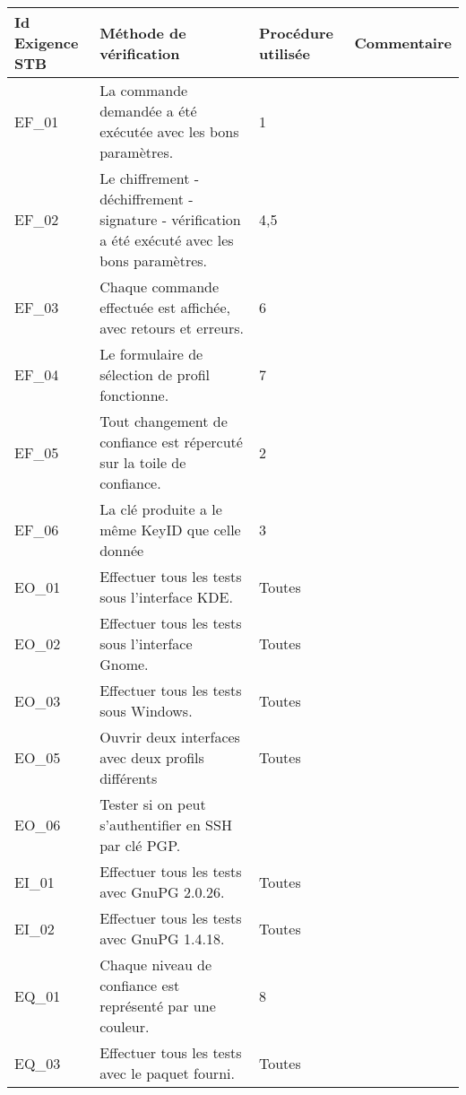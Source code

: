 \documentclass{../res/univ-projet}
\begin{document}
\begin{center}
    \begin{tabular}{|p{2.8cm}|p{4.2cm}|p{3cm}|p{5cm}|}
      \hline
      Id Exigence STB & Méthode de vérification & Procédure utilisée & Commentaire\\ \hline
      EF\_01 & La commande demandée a été exécutée avec les bons paramètres. & 1 & \\ \hline
      EF\_02 & Le chiffrement - déchiffrement - signature - vérification a été exécuté avec les bons paramètres. & 4,5 & \\ \hline
      EF\_03 & Chaque commande effectuée est affichée, avec retours et erreurs. & 6 & \\ \hline
      EF\_04 & Le formulaire de sélection de profil fonctionne. & 7 & \\ \hline
      EF\_05 & Tout changement de confiance est répercuté sur la toile de confiance. & 2 & \\ \hline
      EF\_06 & La clé produite a le même KeyID que celle donnée & 3 & \\ \hline
      EO\_01 & Effectuer tous les tests sous l'interface KDE. & Toutes & \\ \hline
      EO\_02 & Effectuer tous les tests sous l'interface Gnome. & Toutes & \\ \hline
      EO\_03 & Effectuer tous les tests sous Windows. & Toutes & \\ \hline
      EO\_05 & Ouvrir deux interfaces avec deux profils différents & Toutes & \\ \hline
      EO\_06 & Tester si on peut s'authentifier en SSH par clé PGP. &  & \\ \hline
      EI\_01 & Effectuer tous les tests avec GnuPG 2.0.26. & Toutes & \\ \hline 
      EI\_02 & Effectuer tous les tests avec GnuPG 1.4.18. & Toutes & \\ \hline
      EQ\_01 & Chaque niveau de confiance est représenté par une couleur. & 8 & \\ \hline
      EQ\_03 & Effectuer tous les tests avec le paquet fourni. & Toutes & \\ \hline
  \end{tabular}  
\end{center}
\end{document}
